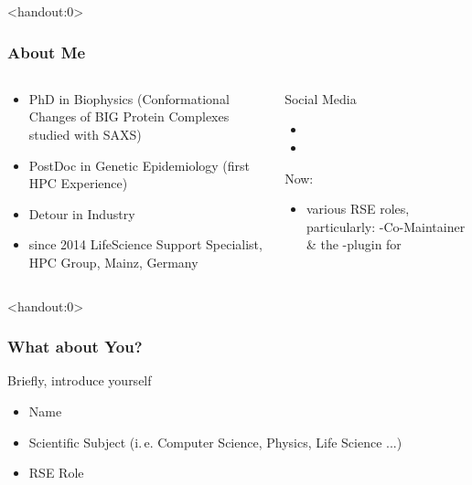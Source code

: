 \begin{frame}<handout:0>
	\frametitle{About Me}
	\begin{columns}
		\begin{column}{0.5\textwidth}
		   \begin{itemize}
		   	 \item PhD in Biophysics (Conformational Changes of BIG Protein Complexes studied with SAXS)
		   	 \item PostDoc in Genetic Epidemiology (first HPC Experience)
		   	 \item Detour in Industry
		   	 \item since 2014 LifeScience Support Specialist, HPC Group, Mainz, Germany
		   	 
		   \end{itemize}
		\end{column}
	    \begin{column}{0.5\textwidth}
	    	Social Media
	    	\begin{itemize}
	    		\item {}
	    		\item {}
	    	\end{itemize}
    	    \pause
    	    Now:
    	    \begin{itemize}
    	    	\item various RSE roles, particularly: \Snakemake{}-Co-Maintainer \& the \slurm-plugin for \Snakemake
    	    \end{itemize}
	    \end{column}
	\end{columns}
\end{frame}

\begin{frame}<handout:0>
	\frametitle{What about You?}
	\begin{question}{
		Briefly, introduce yourself
		\begin{itemize}
			\item Name
			\item Scientific Subject (i.\,e. Computer Science, Physics, Life Science ...)
			\item RSE Role
		\end{itemize}}
	\end{question}
\end{frame}